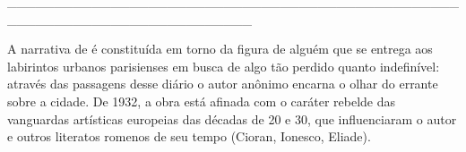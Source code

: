 \hspace*{-2cm}\_\_\_\_\_\_\_\_\_\_\_\_\_\_\_\_\_\_\_\_\_\_\_\_\_\_\_\_\_\_\_\_\_\_\_\_\_\_\_\_\_\_\_\_\_\_\_\_\_\_\_\_\_\_\_\_\_\_\_\_\_\_\_\_\_\_\_\_\_\_\_\_\_\_

\medskip

\noindent{}A narrativa de {} é constituída em torno da figura de alguém que se entrega aos labirintos urbanos parisienses em busca de algo tão perdido quanto indefinível: através das passagens desse diário o autor anônimo encarna o olhar do errante sobre a cidade. De 1932, a obra está afinada com o caráter rebelde das vanguardas artísticas europeias das décadas de 20 e 30, que influenciaram o autor e outros literatos romenos de seu tempo (Cioran, Ionesco, Eliade).

\hspace{.5cm}

\hspace*{-.4cm}\begin{minipage}[c]{0.80\linewidth}
\small{
{}}
\end{minipage}

\pagebreak
